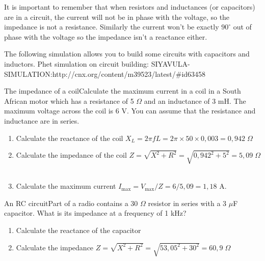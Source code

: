 
It is important to remember that when resistors and inductances (or capacitors) are in a circuit, the current will not be in phase with the voltage, so the impedance is not  a resistance.  Similarly the current won't be exactly $90^{\circ}$ out of phase with the voltage so the impedance isn't a reactance either.

The following simulation allows you to build some circuits with capacitors and inductors.
Phet simulation on circuit building: SIYAVULA-SIMULATION:http://cnx.org/content/m39523/latest/#id63458
\begin{wex}{The impedance of a coil}{Calculate the maximum current in a coil in a South African motor which has a resistance of 5 $\Omega$ and an inductance of 3 mH.  The maximum voltage across the coil is 6 V.  You can assume that the resistance and inductance are in series.}{\begin{enumerate} \item Calculate the reactance of the coil $X_{L} = 2 \pi f L = 2 \pi \times 50 \times 0,003 = 0,942 \; \Omega$ 
\item Calculate the impedance of the coil $Z = \sqrt{X^{2} + R^{2}} = \sqrt{ 0,942^{2} + 5^{2}} = 5,09 \; \Omega$\
\item Calculate the maximum current $I_{\mathrm{max}} = V_{\mathrm{max}} / Z = 6 / 5,09 = 1,18$ A. \end{enumerate}}
\end{wex}

\begin{wex}{An RC circuit}{Part of a radio contains a 30 $\Omega$ resistor in series with a 3 $\mu$F capacitor.  What is its impedance at a frequency of 1 kHz?}{\begin{enumerate} \item 
Calculate the reactance of the capacitor

\item Calculate the impedance $Z = \sqrt{X^{2} + R^{2}} = \sqrt{ 53,05^{2} + 30^{2}} = 60,9 \; \Omega$  \end{enumerate}}
\end{wex}

